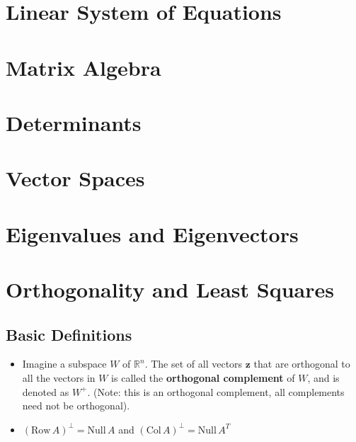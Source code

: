 \documentclass[a4paper,12pt]{article}
\begin{document}
\section{Linear System of Equations}

\section{Matrix Algebra}

\section{Determinants}

\section{Vector Spaces}

\section{Eigenvalues and Eigenvectors}

\section{Orthogonality and Least Squares}
\subsection{Basic Definitions}
\begin{itemize}
\item Imagine a subspace $W$ of $\mathbb{R}^n$. The set of all vectors $\mathbf{z}$ that are orthogonal to all the vectors in $W$ is called the \textbf{orthogonal complement} of $W$, and is denoted as $W^+$. (Note: this is an orthogonal complement, all complements need not be orthogonal).
\item $(\text{Row}\, A)^\perp = \text{Null}\,A$ and $(\text{Col}\,A)^\perp = \text{Null}\,A^T$
\end{itemize}
\end{document}
